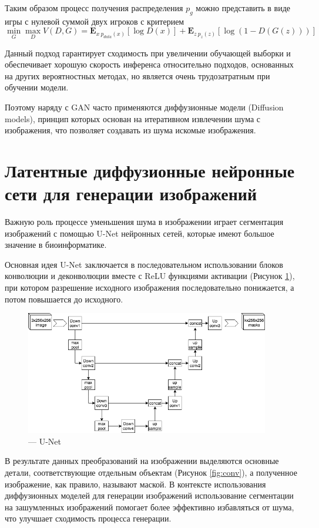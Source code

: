 Таким образом процесс получения распределения $p_g$ можно представить в виде игры с нулевой суммой двух игроков
с критерием \cite{gan}
$$
\min_{G}\max_{D} V(D, G) = \mathbf{E}_{x~p_{data}(x)}[\log D(x)] + \mathbf{E}_{z~p_{z}(z)}[\log (1 - D(G(z)))]
$$ 

Данный подход гарантирует сходимость при увеличении обучающей выборки и обеспечивает хорошую скорость инференса относительно подходов,
основанных на других вероятностных методах, но является очень трудозатратным при обучении модели.

Поэтому наряду с GAN часто применяются диффузионные модели (Dif\-fusion models), принцип которых основан на 
итеративном извлечении шума с изображения, что позволяет создавать из шума искомые изображения.
\section{Латентные диффузионные нейронные сети для генерации изображений}


Важную роль процессе уменьшения шума в изображении играет сегментация изображений с помощью U-Net нейронных сетей,
которые имеют большое значение в биоинформатике.

Основная идея U-Net заключается в последовательном использовании блоков конволюции и деконволюции вместе с ReLU 
функциями активации (Рисунок \ref{fig:unet}), при котором разрешение исходного изображения последовательно понижается, а потом повышается
до исходного. 


\begin{figure}[H]
  \centering
  \includegraphics[width=0.95\textwidth]{img/unet.png}
  \caption{--- U-Net \cite{rombach2022high}}
    \label{fig:unet}
\end{figure}


В результате данных преобразований на изображении выделяются основные детали, соответствующие отдельным объектам (Рисунок \ref{fig:conv}), а полученное изображение,
как правило, называют маской. В контексте использования диффузионных моделей для генерации изображений использование
сегментации на зашумленных изображений помогает более эффективно избавляться от шума, что улучшает сходимость процесса генерации.

